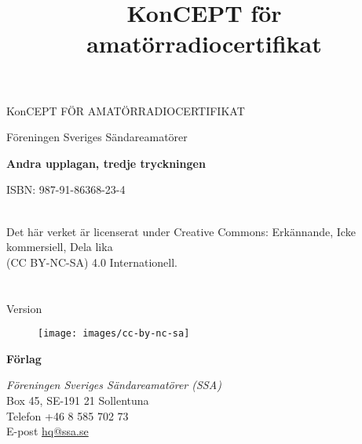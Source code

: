 \onecolumn{}
\vspace{10em}
\title{KonCEPT för amatörradiocertifikat}
\begin{center}
\Large{KonCEPT FÖR AMATÖRRADIOCERTIFIKAT}

Föreningen Sveriges Sändareamatörer\\[2\baselineskip]
\end{center}

\noindent \textbf{Andra upplagan, tredje tryckningen}

\noindent ISBN: 987-91-86368-23-4

\noindent
\\
\noindent Det här verket är licenserat under Creative Commons:\newline
\noindent Erkännande, Icke kommersiell, Dela lika\\
\noindent (CC BY-NC-SA) 4.0 Internationell.\\
\\
\\
\noindent Version \revision

\begin{figure}[h]
    \texttt{[image: images/cc-by-nc-sa]}
\end{figure}


\vfill

\noindent
\textbf{Förlag}

\noindent
\textit{Föreningen Sveriges Sändareamatörer (SSA)}\\
Box 45, SE-191 21 Sollentuna\\
Telefon +46 8 585 702 73\\
E-post \href{mailto:hq@ssa.se}{hq@ssa.se}\\[\baselineskip]
\restoregeometry\twocolumn
{}
